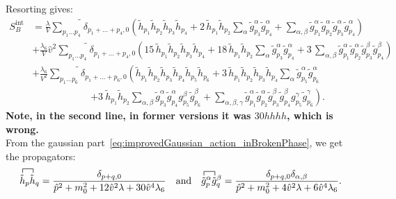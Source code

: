 Resorting gives:
\begin{align}
  \label{eq:improvedInteraction_action_inBrokenPhase_resorted}
   S_B^{\text{int}} & = \frac{\lambda}{V}\widetilde{\sum\limits_{p_1\dots p_4}} \delta_{p_1+ \dots +p_4,0} 
                       \left( \tilde h_{p_1} \tilde h_{p_2} \tilde h_{p_3} \tilde h_{p_4} 
                              + 2 \, \tilde h_{p_1} \tilde h_{p_2} \sum\limits_{\alpha} \tilde g^{\alpha}_{p_3} \tilde g^{\alpha}_{p_4} 
                              + \sum\limits_{\alpha,\beta}  \tilde g^{\alpha}_{p_1} \tilde g^{\alpha}_{p_2} \tilde g^{\alpha}_{p_3} \tilde g^{\alpha}_{p_4} \right)
                      \nonumber \\
                  & + \frac{\lambda_6}{V}\hat v^2 \widetilde{\sum\limits_{p_1\dots p_4}} \delta_{p_1+ \dots +p_4,0} \left(
                    15 \, \tilde h_{p_1} \tilde h_{p_2} \tilde h_{p_3} \tilde h_{p_4} 
                    + 18 \, \tilde h_{p_1} \tilde h_{p_2} \sum\limits_{\alpha} \tilde g^{\alpha}_{p_3} \tilde g^{\alpha}_{p_4}
                    + 3  \, \sum\limits_{\alpha,\beta} \tilde g^{\alpha}_{p_1} \tilde g^{\alpha}_{p_2}\tilde g^{\beta}_{p_3} \tilde g^{\beta}_{p_4}
                 \right)
                      \nonumber \\
                  & + \frac{\lambda_6}{V^2} \widetilde {\sum \limits_{p_1 \dots p_6}} \delta_{p_1+ \dots +p_6,0} 
                \left( \tilde h_{p_1} \tilde h_{p_2} \tilde h_{p_3} \tilde h_{p_4} \tilde h_{p_5} \tilde h_{p_6} 
                    + 3 \, \tilde h_{p_1} \tilde h_{p_2} \tilde h_{p_3} \tilde h_{p_4} \sum\limits_{\alpha} \tilde g^{\alpha}_{p_5} \tilde g^{\alpha}_{p_6}
                       \right. \nonumber \\
                  & \qquad \qquad \qquad\left. 
                  + 3 \  \tilde h_{p_1} \tilde h_{p_2} \sum\limits_{\alpha,\beta} \tilde g^{\alpha}_{p_3} \tilde g^{\alpha}_{p_4} g^{\beta}_{p_5} \tilde g^{\beta}_{p_6}
                  + \sum\limits_{\alpha,\beta,\gamma} 
                  \tilde g^{\alpha}_{p_1} \tilde g^{\alpha}_{p_2}\tilde g^{\beta}_{p_3} \tilde g^{\beta}_{p_4} g^{\gamma}_{p_5} \tilde g^{\gamma}_{p_6}
                \right) .
\end{align}
\textbf{Note, in the second line, in former versions it was $30 hhhh$, which is wrong.\\}
From the gaussian part~\eqref{eq:improvedGaussian_action_inBrokenPhase}, we get the propagators:
\begin{equation}
    \label{eq:prop_HiggsAndGoldstone_improved_inBrokenPhase}
 \contraction{}{\tilde h}{{}_p}{\tilde h{}}  \tilde h_p \tilde h_q = 
                              \frac{ \delta_{p+q,0}}{\hat p^2 + m_0^2 + 12 \hat v^2 \lambda + 30 \hat v^4 \lambda_6 } \quad \text{and} \quad
 \contraction{}{\tilde g}{{}^{\alpha}_p}{\tilde g{}}  \tilde g^{\alpha}_p \tilde g^{\beta}_q = 
                              \frac{ \delta_{p+q,0} \delta_{\alpha,\beta}}{\hat p^2 + m_0^2 + 4 \hat v^2 \lambda + 6 \hat v^4 \lambda_6 }.
\end{equation}

